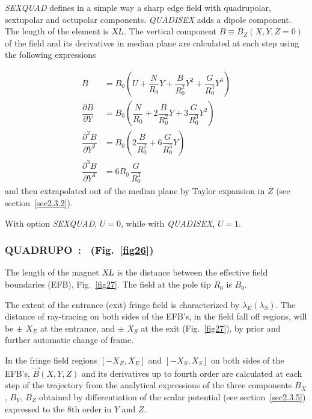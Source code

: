 \textsl{SEXQUAD}    defines in a simple way a sharp edge field with quadrupolar, 
sextupolar and octupolar components. \textsl{QUADISEX}  adds a dipole component. The length of 
the element is $ \textsl{XL} $.  The vertical component $ B \equiv B_Z(X,Y,Z=0) $ of the field and its derivatives in median plane are 
calculated at each step using the following expressions 

\begin{align*}
	B &   =     B_0
	           \left(U+ \dfrac{N }{ R_0}Y + 
	                \dfrac{B }{ R^2_0} Y^2+ \dfrac{G }{ R^3_0} Y^3 \right)  \\
	\dfrac{ \partial B }{ \partial Y} 
	   &   =   B_0 \left(
	             \dfrac{N }{ R_0} + 2 \dfrac{B }{ R^2_0} Y + 3\dfrac{G }{ R^3_0}Y^2 \right) \\  
	\dfrac{ \partial^ 2B }{ \partial Y^2} 
	  &  =     B_0 \left(2 \dfrac{B }{ R^2_0} + 6\dfrac{G }{ R^3_0} Y \right) \\
	\dfrac{ \partial^ 3B }{ \partial Y^3}  
	   & =     6B_0 \,  \dfrac{G }{ R^3_0}
\end{align*}  
    and then extrapolated out of the median plane by Taylor expansion in $ Z $ 
(see section~\ref{sec2.3.2}).
\medskip

\noindent With option \textsl{SEXQUAD}, $ U=0$,  while with \textsl{QUADISEX}, $U=1 $. 

\newpage

\subsubsection*{QUADRUPO~:  \QUADRUPOTitl\  (Fig.~\protect\ref{fig26}) } \label{QUADRUPO}  
\medskip 
{}

The length of the magnet $ \textsl{XL} $ is the distance between the
effective field boundaries (EFB), Fig.~\ref{fig27}. The field at the pole tip $ R_0 $ is $ B_0 $. 

\noindent The extent of the  entrance (exit) fringe field is characterized by 
$ \lambda_ E(\lambda_ S) $.  The distance of ray-tracing on both sides of the
EFB's, in the field fall off regions, will be $\pm$  $ X_E $ at 
the entrance, and $\pm$  $ X_S $ at the exit (Fig.~\ref{fig27}),  
by prior and further automatic change of frame. 

\noindent In the fringe field  regions $[ -X_E,X_E ]$  and 
$[ -X_S,X_S ]$ on both sides of the EFB's, $ \vec  B(X,Y,Z) $ and its derivatives up to
fourth order are calculated at each step of the trajectory from the analytical expressions 
of the three components $ B_X $, $ B_Y $, $ B_Z $ obtained by differentiation
of the scalar potential (see section~\ref{sec2.3.5}) expressed to the 8th order in $ Y $ 
and $ Z $. 

